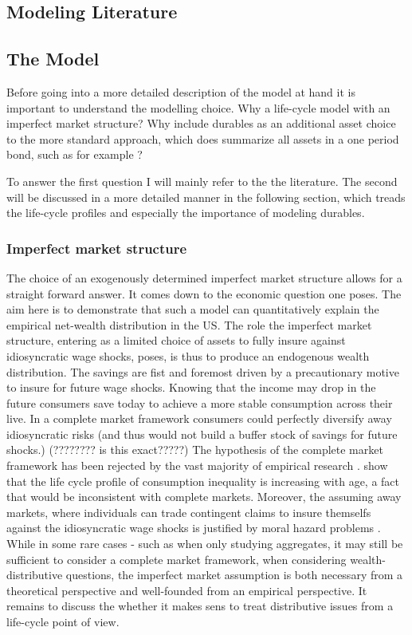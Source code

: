 \documentclass[a4paper,12pt]{article}
\begin{document}
\subsection{Modeling Literature}

\subsection{The Model}
Before going into a more detailed description of the model at hand it is important to understand the modelling choice. Why a life-cycle model with an imperfect market structure? Why include durables as an  additional asset choice to the more standard approach, which does summarize all assets in a one period bond, such as for example \cite{hintermaier2011}? 

To answer the first question I will mainly refer to the the literature. The second will be discussed in a more detailed manner in the following section, which treads the life-cycle profiles and especially the importance of modeling durables. 

\subsubsection{Imperfect market structure}
The choice of an exogenously determined imperfect market structure allows for a straight forward answer. It comes down to the economic question one poses. The aim here is to demonstrate that such a model can quantitatively explain the empirical net-wealth distribution in the US. The role the imperfect market structure, entering as a limited choice of assets to fully insure against idiosyncratic wage shocks, poses, is thus to produce an endogenous wealth distribution. The savings are fist and foremost driven by a precautionary motive to insure for future wage shocks. Knowing that the income may drop in the future consumers save today to achieve a more stable consumption across their live. In a complete market framework consumers could perfectly diversify away idiosyncratic risks \citep{a&w2010}  (and thus would not build a buffer stock of savings for future shocks.) (???????? is this exact?????)
The hypothesis of the complete market framework has been rejected by the vast majority of empirical research \citep{a&w2010}. \cite{deaton1994} show that the life cycle profile of consumption inequality is increasing with age, a fact that would be inconsistent with complete markets. Moreover, the assuming away markets, where individuals can trade contingent claims to insure themselfs against the idiosyncratic wage shocks is justified by moral hazard problems \citep{FV&K2011}. While in some rare cases - such as when only studying aggregates, it may still be sufficient to consider a complete market framework, when considering wealth-distributive questions, the imperfect market assumption is both necessary from a theoretical perspective and well-founded from an empirical perspective. It remains to discuss the whether it makes sens to treat distributive issues from a life-cycle point of view.
\end{document}
